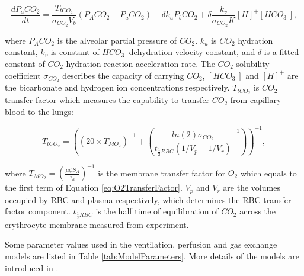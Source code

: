 \begin{equation} 
 \label{eq:CO2ExchangeEquation}
 \frac{dP_a CO_2}{dt} = \frac{T_{tCO_2}}{\sigma_{CO_2}V_b}(P_A CO_2 - P_a CO_2) - \delta k_u P_b CO_2 + \delta \frac{k_v}{\sigma_{CO_2}K}[H]^{+}[HCO^{-}_3],
\end{equation}

\noindent where $P_A CO_2$ is the alveolar partial pressure of $CO_2$. $k_u$ is $CO_2$ hydration constant, $k_v$ is constant of $HCO^{-}_3$ dehydration velocity constant, and $\delta$ is a fitted constant of $CO_2$ hydration reaction acceleration rate. The $CO_2$ solubility coefficient $\sigma_{CO_2}$ describes the capacity of carrying $CO_2$, $[HCO^{-}_3]$ and $[H]^{+}$ are the bicarbonate and hydrogen ion concentrations respectively. $T_{tCO_2}$ is $CO_2$ transfer factor which measures the capability to transfer $CO_2$ from capillary blood to the lungs:

\begin{equation} 
 \label{eq:CO2TransferFactor}
 T_{tCO_2} = ((20 \times T_{MO_2})^{-1} + ({\frac{ln(2)\sigma_{CO_2}}{t_{\frac{1}{2}RBC}(1/V_p + 1/V_r)}}^{-1}))^{-1},
\end{equation}

\noindent where $T_{MO_2} = (\frac{\mu\phi S_A}{\tau_h})^{-1}$ is the membrane transfer factor for $O_2$ which equals to the first term of Equation \ref{eq:O2TransferFactor}. $V_p$ and $V_r$ are the volumes occupied by RBC and plasma respectively, which determines the RBC transfer factor component. $t_{\frac{1}{2}RBC}$ is the half time of equilibration of $CO_2$ across the erythrocyte membrane measured from experiment.

Some parameter values used in the ventilation, perfusion and gas exchange models are listed in Table \ref{tab:ModelParameters}. More details of the models are introduced in \cite{swan2010evidence, swan2010multi,clark2011interdependent,swan2012computational}.

